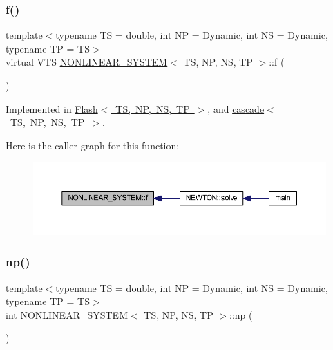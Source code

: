 \subsubsection{\texorpdfstring{f()}{f()}}
{\footnotesize\ttfamily template$<$typename TS = double, int NP = Dynamic, int NS = Dynamic, typename TP = TS$>$ \\
virtual V\+TS \mbox{\hyperlink{class_n_o_n_l_i_n_e_a_r___s_y_s_t_e_m}{N\+O\+N\+L\+I\+N\+E\+A\+R\+\_\+\+S\+Y\+S\+T\+EM}}$<$ TS, NP, NS, TP $>$\+::f (\begin{DoxyParamCaption}{ }\end{DoxyParamCaption})\hspace{0.3cm}{\ttfamily [pure virtual]}}



Implemented in \mbox{\hyperlink{class_flash_ad29e755877ca96aa5b9f34a10d6cd8b2}{Flash$<$ T\+S, N\+P, N\+S, T\+P $>$}}, and \mbox{\hyperlink{classcascade_a9c5bb14ea8b17d1f79c097c6704f1919}{cascade$<$ T\+S, N\+P, N\+S, T\+P $>$}}.

Here is the caller graph for this function\+:\nopagebreak
\begin{figure}[H]
\begin{center}
\leavevmode
\includegraphics[width=350pt]{class_n_o_n_l_i_n_e_a_r___s_y_s_t_e_m_a65827d7df297f26cd3f14f472a212077_icgraph}
\end{center}
\end{figure}
\mbox{\label{class_n_o_n_l_i_n_e_a_r___s_y_s_t_e_m_ab5876470030832088d8ee1ed609d5311}} 
\subsubsection{\texorpdfstring{np()}{np()}}
{\footnotesize\ttfamily template$<$typename TS = double, int NP = Dynamic, int NS = Dynamic, typename TP = TS$>$ \\
int \mbox{\hyperlink{class_n_o_n_l_i_n_e_a_r___s_y_s_t_e_m}{N\+O\+N\+L\+I\+N\+E\+A\+R\+\_\+\+S\+Y\+S\+T\+EM}}$<$ TS, NP, NS, TP $>$\+::np (\begin{DoxyParamCaption}{ }\end{DoxyParamCaption})\hspace{0.3cm}{\ttfamily [inline]}}


